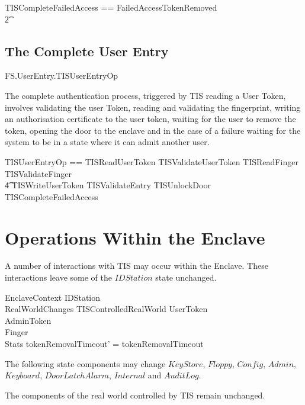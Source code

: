 \begin{zed}
        TISCompleteFailedAccess == FailedAccessTokenRemoved 
\\      \t2     \lor [ WaitingTokenRemoval | status = waitingRemoveTokenFail ] 
\end{zed}

\section{The Complete User Entry}

\begin{traceunit}{FS.UserEntry.TISUserEntryOp}
\end{traceunit}

The complete authentication process, triggered by TIS reading a User
Token, involves validating the user Token, reading and validating the
fingerprint, 
writing an authorisation certificate to the user token, waiting for
the user to remove the token, opening the door to the enclave and
in the case of a failure waiting for the system to
be in a state where it can admit another user.

\begin{zed}
        TISUserEntryOp == TISReadUserToken \lor TISValidateUserToken \lor TISReadFinger \lor
                TISValidateFinger 
\\ \t4          \lor TISWriteUserToken \lor  TISValidateEntry \lor TISUnlockDoor \lor
                TISCompleteFailedAccess 
\end{zed}



\chapter{Operations Within the Enclave}
\label{sec:Enclave}

A number of interactions with TIS may occur within the
Enclave.
These interactions leave some of the $IDStation$ state unchanged.

\begin{schema}{EnclaveContext}
        \Delta IDStation
\\      RealWorldChanges
\also
        \Xi TISControlledRealWorld
\also
        \Xi UserToken
\\      \Xi AdminToken
\\      \Xi Finger
\\      \Xi Stats
\where
        tokenRemovalTimeout' = tokenRemovalTimeout
\end{schema}
\begin{Zcomment}
\item
The following state components may change $KeyStore$, 
$Floppy$, $Config$, $Admin$, $Keyboard$,
$DoorLatchAlarm$, $Internal$ and $AuditLog$. 
\item
The components of the real world controlled by TIS remain unchanged.
\end{Zcomment}

